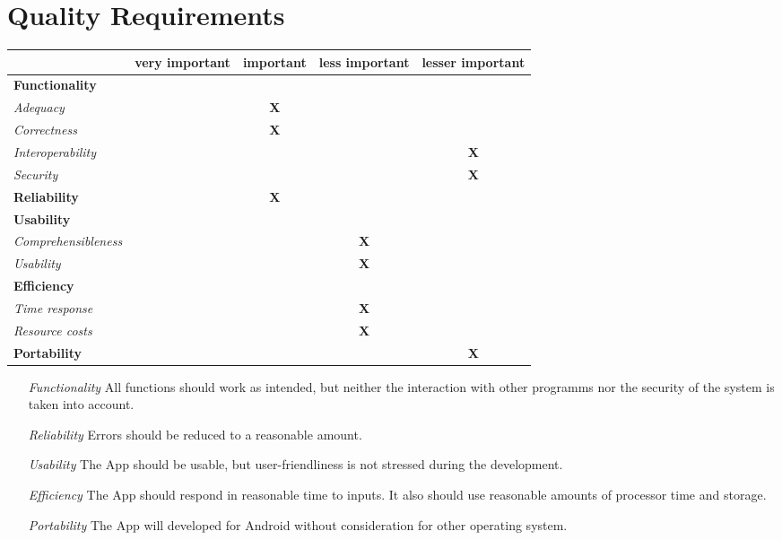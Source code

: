 \section{Quality Requirements}


\begin{center}
 \begin{tabular}{lcccc}
  ~ & very important & important & less important & lesser important \\
  \hline 
  \multicolumn{5}{l}{\textbf{Functionality}} \\
  
  \quad\textit{Adequacy}&&\textbf{X}&&\\
  \quad\textit{Correctness}&&\textbf{X}&&\\
  \quad\textit{Interoperability}&&&& \textbf{X}\\
  \quad\textit{Security}&&&&\textbf{X}\\
 
  \hline
  \textbf{Reliability}&&\textbf{X}&&\\
 
  \hline
  \multicolumn{5}{l}{\textbf{Usability}}\\
  \quad\textit{Comprehensibleness}&&&\textbf{X}&\\
  \quad\textit{Usability}&&&\textbf{X}&\\
  \hline
  \multicolumn{5}{l}{\textbf{Efficiency}}\\
  \quad\textit{Time response}&&&\textbf{X}&\\
  \quad\textit{Resource costs}&&&\textbf{X}&\\
  \hline
  \textbf{Portability}&&&&\textbf{X}\\
  \hline
  \end{tabular}
\end{center}

\begin{itemize}
	\item[\textit{Functionality}] All functions should work as intended, but neither the interaction with other programms nor the security of the system is taken into account.
	
	\item[\textit{Reliability}] Errors should be reduced to a reasonable amount.
	
	\item[\textit{Usability}] The App should be usable, but user-friendliness is not stressed during the development.
	
	\item[\textit{Efficiency}] The App should respond in reasonable time to inputs. It also should use reasonable amounts of processor time and storage.
	
	\item[\textit{Portability}] The App will developed for Android without consideration for other operating system. 
\end{itemize}

